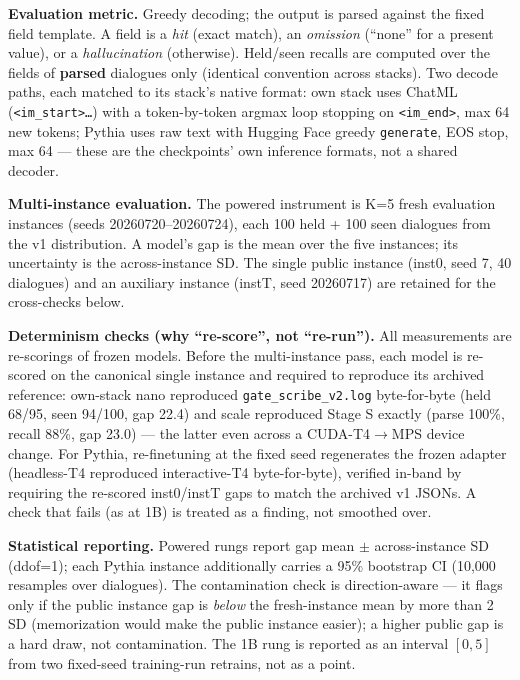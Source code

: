 \documentclass[11pt]{article}
\begin{document}
\textbf{Evaluation metric.} Greedy decoding; the output is parsed against the fixed field template. A field is a \emph{hit} (exact match), an \emph{omission} (``none'' for a present value), or a \emph{hallucination} (otherwise). Held/seen recalls are computed over the fields of \textbf{parsed} dialogues only (identical convention across stacks). Two decode paths, each matched to its stack's native format: own stack uses ChatML (\texttt{\textless{}\textbar{}im\_start\textbar{}\textgreater{}…}) with a token-by-token argmax loop stopping on \texttt{\textless{}\textbar{}im\_end\textbar{}\textgreater{}}, max 64 new tokens; Pythia uses raw text with Hugging Face greedy \texttt{generate}, EOS stop, max 64 --- these are the checkpoints' own inference formats, not a shared decoder.

\textbf{Multi-instance evaluation.} The powered instrument is K=5 fresh evaluation instances (seeds 20260720--20260724), each 100 held + 100 seen dialogues from the v1 distribution. A model's gap is the mean over the five instances; its uncertainty is the across-instance SD. The single public instance (inst0, seed 7, 40 dialogues) and an auxiliary instance (instT, seed 20260717) are retained for the cross-checks below.

\textbf{Determinism checks (why ``re-score'', not ``re-run'').} All measurements are re-scorings of frozen models. Before the multi-instance pass, each model is re-scored on the canonical single instance and required to reproduce its archived reference: own-stack nano reproduced \texttt{gate\_scribe\_v2.log} byte-for-byte (held 68/95, seen 94/100, gap 22.4) and scale reproduced Stage S exactly (parse 100\%, recall 88\%, gap 23.0) --- the latter even across a CUDA-T4$\rightarrow$MPS device change. For Pythia, re-finetuning at the fixed seed regenerates the frozen adapter (headless-T4 reproduced interactive-T4 byte-for-byte), verified in-band by requiring the re-scored inst0/instT gaps to match the archived v1 JSONs. A check that fails (as at 1B) is treated as a finding, not smoothed over.

\textbf{Statistical reporting.} Powered rungs report gap mean $\pm$ across-instance SD (ddof=1); each Pythia instance additionally carries a 95\% bootstrap CI (10,000 resamples over dialogues). The contamination check is direction-aware --- it flags only if the public instance gap is \emph{below} the fresh-instance mean by more than 2 SD (memorization would make the public instance easier); a higher public gap is a hard draw, not contamination. The 1B rung is reported as an interval $[0,5]$ from two fixed-seed training-run retrains, not as a point.
\end{document}

